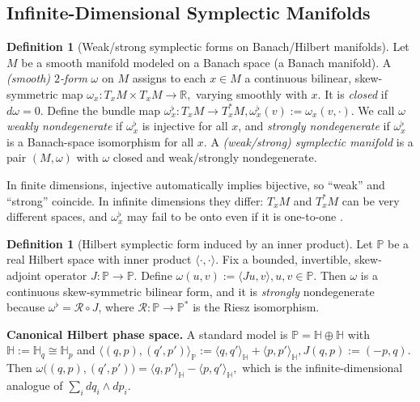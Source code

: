 \documentclass{article}
\theoremstyle{plain}
\theoremstyle{definition}
\newtheorem{definition}[theorem]{Definition}
\theoremstyle{remark}
\newcommand{\bbH}{\mathbb{H}}
\newcommand{\bbP}{\mathbb{P}}
\begin{document}
\subsection{Infinite-Dimensional Symplectic Manifolds}
\label{subsec:inf-dim-symplectic}

\begin{definition}[Weak/strong symplectic forms on Banach/Hilbert manifolds]
Let $M$ be a smooth manifold modeled on a Banach space (a Banach manifold).
A \emph{(smooth) $2$-form} $\omega$ on $M$ assigns to each $x\in M$ a continuous bilinear,
skew-symmetric map
\(
\omega_x : T_xM \times T_xM \to \mathbb{R},
\)
varying smoothly with $x$. It is \emph{closed} if $d\omega = 0$.
Define the bundle map
\(
\omega^\flat_x : T_xM \to T_x^*M, \omega^\flat_x(v) := \omega_x(v,\cdot).
\)
We call $\omega$ 
\emph{weakly nondegenerate} if $\omega^\flat_x$ is injective for all $x$, and \emph{strongly nondegenerate} if $\omega^\flat_x$ is a Banach-space isomorphism for all $x$.
A \emph{(weak/strong) symplectic manifold} is a pair $(M,\omega)$ with $\omega$ closed and weak/strongly nondegenerate.
\end{definition}
In finite dimensions, injective automatically implies bijective, so ``weak'' and ``strong''
coincide. In infinite dimensions they differ: $T_xM$ and $T_x^*M$ can be very different spaces, and
$\omega^\flat_x$ may fail to be onto even if it is one-to-one \cite{bambusi1999darbouxWeak}.
\begin{definition}[Hilbert symplectic form induced by an inner product]
Let $\bbP$ be a real Hilbert space with inner product $\langle \cdot,\cdot\rangle$.
Fix a bounded, invertible, skew-adjoint operator $J:\bbP\to\bbP$.
Define
\(
\omega(u,v) := \langle Ju, v\rangle, u,v\in\bbP.
\)
Then $\omega$ is a continuous skew-symmetric bilinear form, and it is \emph{strongly} nondegenerate because
$\omega^\flat = \mathcal{R}\circ J$, where $\mathcal{R}:\bbP\to\bbP^*$ is the Riesz isomorphism.
\end{definition}
\textbf{Canonical Hilbert phase space.}
A standard model is $\bbP = \bbH \oplus \bbH$ with $\bbH:= \bbH_q \cong \bbH_p$ and
\(
\langle (q,p),(q',p')\rangle_{\bbP} := \langle q,q'\rangle_{\bbH} + \langle p,p'\rangle_{\bbH},
J(q,p) := (-p,q).
\)
Then
\(
\omega\big((q,p),(q',p')\big) = \langle q,p'\rangle_{\bbH} - \langle p,q'\rangle_{\bbH},
\)
which is the infinite-dimensional analogue of $\sum_i dq_i\wedge dp_i$.
\end{document}
